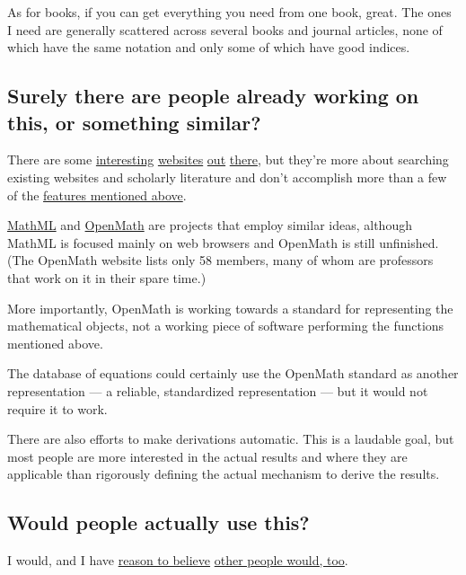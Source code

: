 \documentclass[12pt,letterpaper]{article}
\begin{document}

As for books, if you can get everything you need from one book, great. The ones I need are generally scattered across several books and journal articles, none of which have the same notation and only some of which have good indices.

\subsection{Surely there are people already working on this, or something similar?}

There are some
\href{http://symbolab.com/}{interesting} \href{http://latexsearch.com/}{websites} \href{http://www.dessci.com/en/reference/searching/math-searching.htm}{out}
\href{http://www.equationsheet.com/}{there},
but they're more about searching existing websites and scholarly literature and don't accomplish more than a few of the \hyperref[features]{features mentioned above}.

\href{http://www.w3.org/Math/}{MathML} and \href{http://www.openmath.org/}{OpenMath} are projects that employ similar ideas, although MathML is focused mainly on web browsers and OpenMath is still unfinished. (The OpenMath website lists only 58 members, many of whom are professors that work on it in their spare time.)

More importantly, OpenMath is working towards a standard for representing the mathematical objects, not a working piece of software performing the functions mentioned above.

The database of equations could certainly use the OpenMath standard as another representation --- a reliable, standardized representation --- but it would not require it to work.

There are also efforts to make derivations automatic. This is a laudable goal, but most people are more interested in the actual results and where they are applicable than rigorously defining the actual mechanism to derive the results.

\subsection{Would people actually use this?}

I would, and I have \href{http://www.researchgate.net/post/I_am_looking_for_an_equation_database_or_digital_list_of_equations}{reason to believe} \href{http://productforums.google.com/forum/#!topic/websearch/lVJiyCSl-xk}{other people would, too}.
\end{document}
